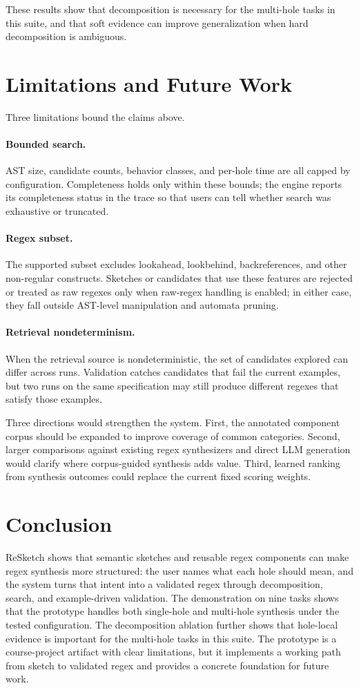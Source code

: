 \documentclass[sigconf,nonacm]{acmart}
\begin{document}
These results show that decomposition is necessary for the multi-hole tasks in
this suite, and that soft evidence can improve generalization when hard
decomposition is ambiguous.

\section{Limitations and Future Work}
Three limitations bound the claims above.

\paragraph{Bounded search.}
AST size, candidate counts, behavior classes, and per-hole time are all capped
by configuration. Completeness holds only within these bounds; the engine
reports its completeness status in the trace so that users can tell whether
search was exhaustive or truncated.

\paragraph{Regex subset.}
The supported subset excludes lookahead, lookbehind, backreferences, and other
non-regular constructs. Sketches or candidates that use these features are
rejected or treated as raw regexes only when raw-regex handling is enabled; in
either case, they fall outside AST-level manipulation and automata pruning.

\paragraph{Retrieval nondeterminism.}
When the retrieval source is nondeterministic, the set of candidates explored
can differ across runs. Validation catches candidates that fail the current
examples, but two runs on the same specification may still produce different
regexes that satisfy those examples.

Three directions would strengthen the system. First, the annotated component
corpus should be expanded to improve coverage of common categories. Second,
larger comparisons against existing regex synthesizers and direct LLM
generation would clarify where corpus-guided synthesis adds value. Third,
learned ranking from synthesis outcomes could replace the current fixed scoring
weights.

\section{Conclusion}
ReSketch shows that semantic sketches and reusable regex components can make
regex synthesis more structured: the user names what each hole should mean,
and the system turns that intent into a validated regex through decomposition,
search, and example-driven validation. The demonstration on nine tasks shows
that the prototype handles both single-hole and multi-hole synthesis under the
tested configuration. The decomposition ablation further shows that
hole-local evidence is important for the multi-hole tasks in this suite. The
prototype is a course-project artifact with clear limitations, but it
implements a working path from sketch to validated regex and provides a
concrete foundation for future work.
\end{document}
